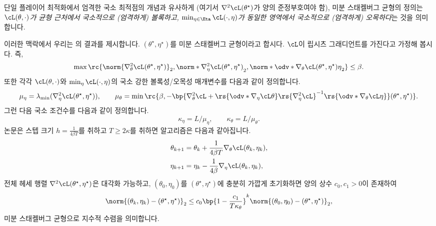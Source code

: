 \documentclass[../../book-main_ko.tex]{subfiles}
\begin{document}
단일 플레이어 최적화에서 엄격한 국소 최적점의 개념과 유사하게 (여기서 \(\nabla^{2}\cL(\theta^{\star})\)가 양의 준정부호여야 함), 미분 스태켈버그 균형의 정의는 \textit{\(\cL(\theta, \cdot)\)가 균형 근처에서 국소적으로 (엄격하게) 볼록하고, \(\min_{\eta \in \Eta}\cL(\cdot, \eta)\)가 동일한 영역에서 국소적으로 (엄격하게) 오목하다}는 것을 의미합니다.

이러한 맥락에서 우리는 \cite{li2022convergence}의 결과를 제시합니다. \((\theta^{\star}, \eta^{\star})\)를 미분 스태켈버그 균형이라고 합시다. \(\cL\)이 립시츠 그래디언트를 가진다고 가정해 봅시다. 즉,
\begin{equation}
    \max\rc{\norm{\nabla_{\theta}^{2}\cL(\theta^{\star}, \eta^{\star})}_{2}, \norm*{\nabla_{\eta}^{2}\cL(\theta^{\star}, \eta^{\star})}_{2},  \norm*{\odv*{\nabla_{\theta}\cL(\theta^{\star}, \eta^{\star})}{\eta}}_{2}} \leq \beta.
\end{equation}
또한 각각 \(\cL(\theta, \cdot)\)와 \(\min_{\eta}\cL(\cdot, \eta)\)의 국소 강한 볼록성/오목성 매개변수를 다음과 같이 정의합니다.
\begin{equation}
    \mu_{\eta} = \lambda_{\min}(\nabla_{\eta}^{2}\cL(\theta^{\star}, \eta^{\star})), \qquad \mu_{\theta} = \min\rc{\beta, -\bp{\nabla_{\theta}^{2}\cL + \rs{\odv*{\nabla_{\eta}\cL}{\theta}}\rs{\nabla_{\eta}^{2}\cL}^{-1}\rs{\odv*{\nabla_{\theta}\cL}{\eta}}}(\theta^{\star}, \eta^{\star})}.
\end{equation}
그런 다음 국소 조건수를 다음과 같이 정의합니다.
\begin{equation}
    \kappa_{\eta} = L/\mu_{\eta}, \qquad \kappa_{\theta} = L/\mu_{\theta}.
\end{equation}
\cite{li2022convergence} 논문은 스텝 크기 \(h = \frac{1}{4\beta T}\)를 취하고 \(T \geq 2\kappa\)를 취하면 알고리즘은 다음과 같아집니다.
\begin{align}
    \theta_{k + 1}
    &= \theta_{k} + \frac{1}{4\beta T}\nabla_{\theta} \cL(\theta_{k}, \eta_{k}), \\
    \eta_{k + 1}
    &= \eta_{k} - \frac{1}{4\beta}\nabla_{\eta} \cL(\theta_{k}, \eta_{k}),
\end{align}
전체 헤세 행렬 \(\nabla^{2}\cL(\theta^{\star}, \eta^{\star})\)은 대각화 가능하고, \((\theta_{0}, \eta_{0})\)를 \((\theta^{\star}, \eta^{\star})\)에 충분히 가깝게 초기화하면 양의 상수 \(c_{0}, c_{1} > 0\)이 존재하여
\begin{equation}
    \norm{(\theta_{k}, \eta_{k}) - (\theta^{\star}, \eta^{\star})}_{2} \leq c_{0}\bp{1 - \frac{c_{1}}{T\kappa_{\theta}}}^{k}\norm{(\theta_{0}, \eta_{0}) - (\theta^{\star}, \eta^{\star})}_{2},
\end{equation}
미분 스태켈버그 균형으로 지수적 수렴을 의미합니다.
\end{document}
